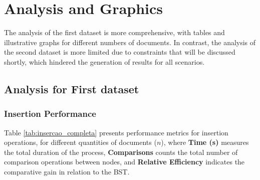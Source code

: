 \section{Analysis and Graphics}

The analysis of the first dataset is more comprehensive, with tables and illustrative graphs for different 
numbers of documents. In contrast, the analysis of the second dataset is more limited due to constraints that 
will be discussed shortly, which hindered the generation of results for all scenarios.
\subsection{Analysis for First dataset}

 \subsubsection{Insertion Performance}

 Table \ref{tab:insercao_completa} presents performance metrics for insertion operations,
 for different quantities of documents ($n$), where \textbf{Time (s)} measures the total duration of the process, \textbf{Comparisons} counts the total number
 of comparison operations between nodes, and \textbf{Relative Efficiency} indicates the comparative gain
 in relation to the BST.

